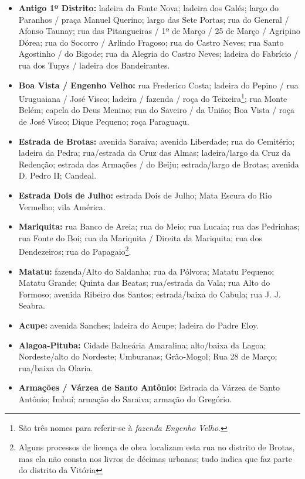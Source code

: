 \begin{itemize}
\item \textbf{Antigo 1º Distrito:} ladeira da Fonte Nova; ladeira dos Galés; largo do Paranhos / praça Manuel Querino; largo das Sete Portas; rua do General / Afonso Taunay; rua das Pitangueiras / 1º de Março / 25 de Março / Agripino Dórea;  rua do Socorro / Arlindo Fragoso; rua do Castro Neves; rua Santo Agostinho / do Bigode; rua da Alegria do Castro Neves; ladeira do Fabrício / rua dos Tupys / ladeira dos Bandeirantes.
\item \textbf{Boa Vista / Engenho Velho:} rua Frederico Costa; ladeira do Pepino / rua Uruguaiana / José Visco; ladeira / fazenda / roça do Teixeira\footnote{São três nomes para referir-se à \textit{fazenda Engenho Velho}.}; rua Monte Belém; capela do Deus Menino; rua do Saveiro / da União; Boa Vista / roça de José Visco; Dique Pequeno; roça Paraguaçu.
\item \textbf{Estrada de Brotas:} avenida Saraiva; avenida Liberdade; rua do Cemitério; ladeira da Pedra; rua/estrada da Cruz das Almas; ladeira/largo da Cruz da Redenção; estrada das Armações / do Beiju; estrada/largo de Brotas; avenida D. Pedro II; Candeal.
\item \textbf{Estrada Dois de Julho:} estrada Dois de Julho; Mata Escura do Rio Vermelho; vila América.
\item \textbf{Mariquita:} rua Banco de Areia; rua do Meio; rua Lucaia; rua das Pedrinhas; rua Fonte do Boi; rua da Mariquita / Direita da Mariquita; rua dos Dendezeiros; rua do Papagaio\footnote{Alguns processos de licença de obra localizam esta rua no distrito de Brotas, mas ela não consta nos livros de décimas urbanas; tudo indica que faz parte do distrito da Vitória}.
\item \textbf{Matatu:} fazenda/Alto do Saldanha; rua da Pólvora; Matatu Pequeno; Matatu Grande; Quinta das Beatas; rua/estrada da Vala; rua Alto do Formoso; avenida Ribeiro dos Santos; estrada/baixa do Cabula; rua J. J. Seabra.
\item \textbf{Acupe:} avenida Sanches; ladeira do Acupe; ladeira do Padre Eloy.
\item \textbf{Alagoa-Pituba:} Cidade Balneária Amaralina; alto/baixa da Lagoa; Nordeste/alto do Nordeste; Umburanas; Grão-Mogol; Rua 28 de Março; rua/baixa da Olaria.
\item \textbf{Armações / Várzea de Santo Antônio:} Estrada da Várzea de Santo Antônio; Imbuí; armação do Saraiva; armação do Gregório.
\end{itemize}

